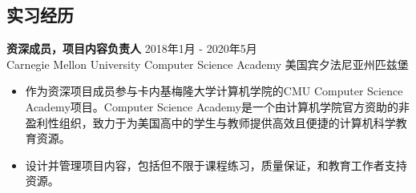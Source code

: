\documentclass[margin, 10pt]{res} %
\begin{document}
\begin{resume}
\section{实习经历}

{\bf 资深成员，项目内容负责人} \hfill 2018年1月 - 2020年5月 \\
Carnegie Mellon University Computer Science Academy \hfill 美国宾夕法尼亚州匹兹堡

\begin{itemize}
\item 作为资深项目成员参与卡内基梅隆大学计算机学院的CMU Computer Science Academy项目。Computer Science Academy是一个由计算机学院官方资助的非盈利性组织，致力于为美国高中的学生与教师提供高效且便捷的计算机科学教育资源。
\item 设计并管理项目内容，包括但不限于课程练习，质量保证，和教育工作者支持资源。
\end{itemize} 



\end{resume}
\end{document}
